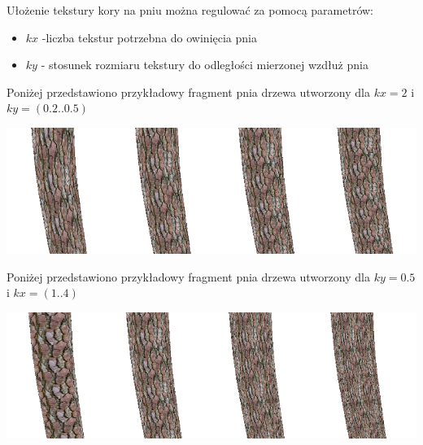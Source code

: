 Ułożenie tekstury kory na pniu można regulować za pomocą parametrów:
\begin{itemize}
\item ${kx}$ -liczba tekstur potrzebna do owinięcia pnia
\item ${ky}$ - stosunek rozmiaru tekstury do odległości mierzonej wzdłuż pnia
\end{itemize}
Poniżej przedstawiono przykładowy fragment pnia drzewa utworzony dla ${kx=2}$ i ${ky=(0.2..0.5)}$
\begin{center}
	\includegraphics[width=140mm]{images/textures/ky.png}
	\label{ky_texture}
\end{center}
Poniżej przedstawiono przykładowy fragment pnia drzewa utworzony dla ${ky=0.5}$ i ${kx=(1..4)}$
\begin{center}
	\includegraphics[width=140mm]{images/textures/kx.png}
	\label{kx_texture}
\end{center}

